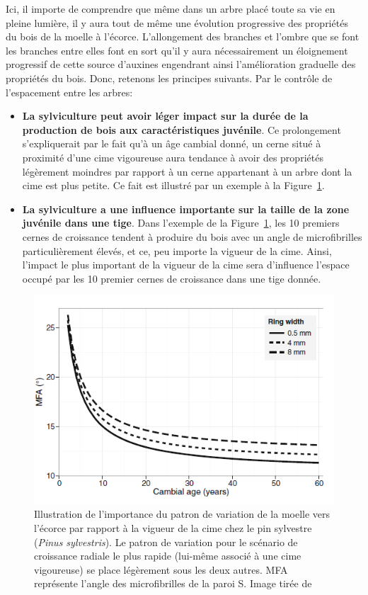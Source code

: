 Ici, il importe de comprendre que même dans un arbre placé toute sa vie en pleine lumière, il y aura tout de même une évolution progressive des propriétés du bois de la moelle à l'écorce. L'allongement des branches et l'ombre que se font les branches entre elles font en sort qu'il y aura nécessairement un éloignement progressif de cette source d'auxines engendrant ainsi l'amélioration graduelle des propriétés du bois. Donc, retenons les principes suivants. Par le contrôle de l'espacement entre les arbres:

\begin{itemize}
	\item \textbf{La sylviculture peut avoir léger impact sur la durée de la production de bois aux caractéristiques juvénile}. Ce prolongement s'expliquerait par le fait qu'à un âge cambial donné, un cerne situé à proximité d'une cime vigoureuse aura tendance à avoir des propriétés légèrement moindres par rapport à un cerne appartenant à un arbre dont la cime est plus petite. Ce fait est illustré par un exemple à la Figure~\ref{fig:auty_mfa}.
	\item \textbf{La sylviculture a une influence importante sur la taille de la zone juvénile dans une tige}. Dans l'exemple de la Figure~\ref{fig:auty_mfa}, les 10 premiers cernes de croissance tendent à produire du bois avec un angle de microfibrilles particulièrement élevés, et ce, peu importe la vigueur de la cime. Ainsi, l'impact le plus important de la vigueur de la cime sera d'influence l'espace occupé par les 10 premier cernes de croissance dans une tige donnée.
\end{itemize}

\begin{figure}[ht]
	\centering
	\includegraphics[width=0.8\linewidth]{img/ch8_auty_mfa}
	\caption{Illustration de l'importance du patron de variation de la moelle vers l'écorce par rapport à la vigueur de la cime chez le pin sylvestre (\textit{Pinus sylvestris}). Le patron de variation pour le scénario de croissance radiale le plus rapide (lui-même associé à une cime vigoureuse) se place légèrement sous les deux autres. MFA représente l'angle des microfibrilles de la paroi S. Image tirée de \cite{auty2013models}}
	\label{fig:auty_mfa}
\end{figure}

